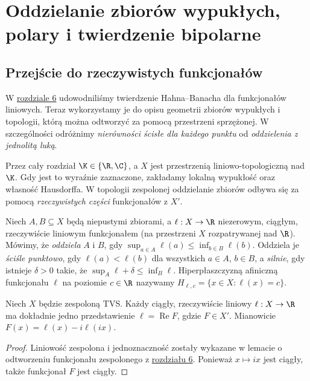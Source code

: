 \setcounter{section}{6}
\section{Oddzielanie zbiorów wypukłych, polary i twierdzenie bipolarne}\label{sec:separacja-bipolarne}

\providecommand{\atlasref}[2]{#2}


\subsection{Przejście do rzeczywistych funkcjonałów}

W \hyperref[sec:hahn-banach]{rozdziale 6} udowodniliśmy twierdzenie Hahna--Banacha dla funkcjonałów liniowych.
Teraz wykorzystamy je do opisu geometrii zbiorów wypukłych i topologii,
którą można odtworzyć za pomocą przestrzeni sprzężonej. W szczególności odróżnimy
\emph{nierówności ścisłe dla każdego punktu} od \emph{oddzielenia z jednolitą luką}.

Przez cały rozdział $\K\in\{\R,\C\}$, a $X$ jest przestrzenią liniowo-topologiczną
nad $\K$. Gdy jest to wyraźnie zaznaczone, zakładamy lokalną wypukłość
oraz własność Hausdorffa. W topologii zespolonej oddzielanie zbiorów
odbywa się za pomocą \emph{rzeczywistych części} funkcjonałów z $X'$.

\begin{definicja}\label{def:separacja}
Niech $A,B\subseteq X$ będą niepustymi zbiorami, a
$\ell:X\to\R$ niezerowym, ciągłym, rzeczywiście liniowym funkcjonałem
(na przestrzeni $X$ rozpatrywanej nad $\R$). Mówimy, że
\emph{oddziela} $A$ i $B$, gdy
$\sup_{a\in A}\ell(a)\le\inf_{b\in B}\ell(b)$.
Oddziela je \emph{ściśle punktowo}, gdy $\ell(a)<\ell(b)$
dla wszystkich $a\in A$, $b\in B$, a \emph{silnie}, gdy istnieje
$\delta>0$ takie, że $\sup_A\ell+\delta\le\inf_B\ell$.
Hiperpłaszczyzną afiniczną funkcjonału $\ell$ na poziomie $c\in\R$
nazywamy $H_{\ell,c}=\{x\in X:\ell(x)=c\}$.
\end{definicja}

\begin{lemat}\label{lem:realification}
Niech $X$ będzie zespoloną TVS. Każdy ciągły, rzeczywiście liniowy
$\ell:X\to\R$ ma dokładnie jedno przedstawienie
$\ell=\operatorname{Re}F$, gdzie $F\in X'$. Mianowicie
$F(x)=\ell(x)-i\ell(ix)$.
\end{lemat}
\begin{proof}
Liniowość zespolona i jednoznaczność zostały wykazane w
lemacie o odtworzeniu funkcjonału zespolonego z \hyperref[sec:hahn-banach]{rozdziału 6}. Ponieważ $x\mapsto ix$
jest ciągły, także funkcjonał $F$ jest ciągły.
\end{proof}

